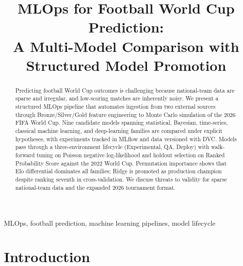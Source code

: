 \documentclass[conference]{IEEEtran}
\begin{document}
\title{MLOps for Football World Cup Prediction:\\
A Multi-Model Comparison with Structured Model Promotion}

\author{
  \and
}

\maketitle

\begin{abstract}
Predicting football World Cup outcomes is challenging because national-team
data are sparse and irregular, and low-scoring matches are inherently noisy.
We present a structured MLOps pipeline that automates ingestion from two
external sources through Bronze/Silver/Gold feature engineering to Monte Carlo
simulation of the 2026 FIFA World Cup.
Nine candidate models spanning statistical, Bayesian, time-series, classical
machine learning, and deep-learning families are compared under explicit
hypotheses, with experiments tracked in MLflow and data versioned with DVC.
Models pass through a three-environment lifecycle (Experimental, QA, Deploy)
with walk-forward tuning on Poisson negative log-likelihood and holdout
selection on Ranked Probability Score against the 2022 World Cup.
Permutation importance shows that Elo differential dominates all families;
Ridge is promoted as production champion despite ranking seventh in
cross-validation.
We discuss threats to validity for sparse national-team data and the expanded
2026 tournament format.
\end{abstract}

\begin{IEEEkeywords}
MLOps, football prediction, machine learning pipelines, model lifecycle
\end{IEEEkeywords}

\section{Introduction}
\label{sec:intro}
\end{document}
